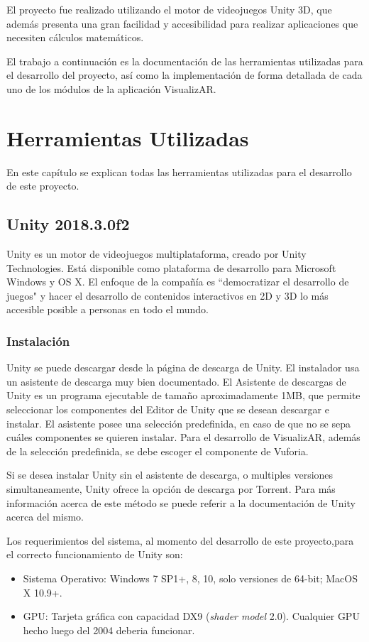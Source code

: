 El proyecto fue realizado utilizando el motor de videojuegos Unity 3D, que además presenta una gran facilidad y accesibilidad para realizar aplicaciones que necesiten cálculos matemáticos. 

El trabajo a continuación es la documentación de las herramientas utilizadas para el desarrollo del proyecto, así como la implementación de forma detallada de cada uno de los módulos de la aplicación VisualizAR.


\chapter{Herramientas Utilizadas}
En este capítulo se explican todas las herramientas utilizadas para el desarrollo de este proyecto.

\section{Unity 2018.3.0f2}
Unity es un motor de videojuegos multiplataforma, creado por Unity Technologies. Está disponible como plataforma de desarrollo para Microsoft Windows y OS X. El enfoque de la compañía es “democratizar el desarrollo de juegos" y hacer el desarrollo de contenidos interactivos en 2D y 3D lo más accesible posible a personas en todo el mundo.

\subsection{Instalación}
Unity se puede descargar desde la página de descarga de Unity. El instalador usa un asistente de descarga muy bien documentado. El Asistente de descargas de Unity es un programa ejecutable de tamaño aproximadamente 1MB, que permite seleccionar los componentes del Editor de Unity que se desean descargar e instalar. El asistente posee una selección predefinida, en caso de que no se sepa cuáles componentes se quieren instalar. Para el desarrollo de VisualizAR, además de la selección predefinida, se debe escoger el componente de Vuforia.

Si se desea instalar Unity sin el asistente de descarga, o multiples versiones simultaneamente, Unity ofrece la opción de descarga por Torrent. Para más información acerca de este método se  puede referir a la documentación de Unity acerca del mismo.

Los requerimientos del sistema, al momento del desarrollo de este proyecto,para el correcto funcionamiento de Unity son: 
\begin{itemize}
    \item Sistema Operativo: Windows 7 SP1+, 8, 10, solo versiones de 64-bit; MacOS X 10.9+.
    \item GPU: Tarjeta gráfica con capacidad DX9 (\textit{shader model} 2.0). Cualquier GPU hecho luego del 2004 deberia funcionar.
\end{itemize}

